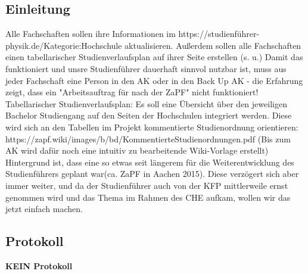   \subsection{Einleitung}
	Alle Fachschaften sollen ihre Informationen im https://studienführer-physik.de/Kategorie:Hochschule aktualisieren. Außerdem sollen alle Fachschaften einen tabellarischer Studienverlaufsplan auf ihrer Seite erstellen (s. u.) Damit das funktioniert und unsre Studienführer dauerhaft sinnvol nutzbar ist, muss aus jeder Fachschaft eine Person in den AK oder in den Back Up AK - die Erfahrung zeigt, dass ein "Arbeitsauftrag für nach der ZaPF" nicht funktioniert!
	Tabellarischer Studienverlaufsplan: Es soll eine Übersicht über den jeweiligen Bachelor Studiengang auf den Seiten der Hochschulen integriert werden. Diese wird sich an den Tabellen im Projekt kommentierte Studienordnung orientieren: https://zapf.wiki/images/b/bd/KommentierteStudienordnungen.pdf (Bis zum AK wird dafür noch eine intuitiv zu bearbeitende Wiki-Vorlage erstellt)
	Hintergrund ist, dass eine so etwas seit längerem für die Weiterentwicklung des Studienführers geplant war(ca. ZaPF in Aachen 2015). Diese verzögert sich aber immer weiter, und da der Studienführer auch von der KFP mittlerweile ernst genommen wird und das Thema im Rahmen des CHE aufkam, wollen wir das jetzt einfach machen.

  \subsection*{Protokoll}
  	\textbf{KEIN Protokoll}
